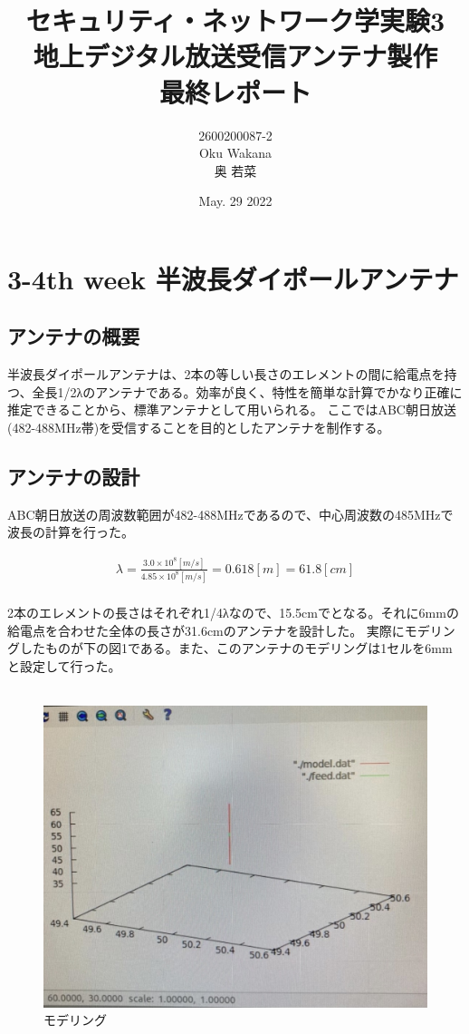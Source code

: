 \documentclass[dvipdfmx,autodetect-engine,titlepage]{jsarticle}
\title{セキュリティ・ネットワーク学実験3\\
地上デジタル放送受信アンテナ製作\\
最終レポート
}
\author{2600200087-2\\Oku Wakana\\奥 若菜}
\date{May. 29 2022}
\begin{document}
\maketitle

\section{3-4th week 半波長ダイポールアンテナ}
\subsection{アンテナの概要}
半波長ダイポールアンテナは、2本の等しい長さのエレメントの間に給電点を持つ、全長1/2λのアンテナである。効率が良く、特性を簡単な計算でかなり正確に推定できることから、標準アンテナとして用いられる。
ここではABC朝日放送(482-488MHz帯)を受信することを目的としたアンテナを制作する。\\

\subsection{アンテナの設計}
ABC朝日放送の周波数範囲が482-488MHzであるので、中心周波数の485MHzで波長の計算を行った。

\begin{eqnarray*}
  \lambda = \frac{3.0 \times 10^8 [m/s]}{4.85 \times 10^8 [m/s]} = 0.618[m] = 61.8[cm]\\
\end{eqnarray*}

2本のエレメントの長さはそれぞれ1/4λなので、15.5cmでとなる。それに6mmの給電点を合わせた全体の長さが31.6cmのアンテナを設計した。
実際にモデリングしたものが下の図1である。また、このアンテナのモデリングは1セルを6mmと設定して行った。\\\\

\begin{figure}[H]
  \centering
  \includegraphics[scale=0.25]{fg1.jpg}
  \caption{モデリング}\label{fig:図1}
\end{figure}
\end{document}
